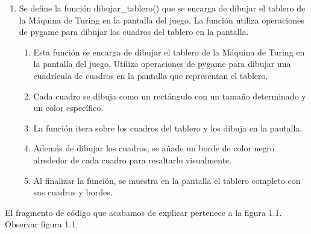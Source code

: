 \begin{enumerate}
    \item Se define la función dibujar\_tablero() que se encarga de dibujar el tablero de la Máquina de Turing en la pantalla del juego. La función utiliza operaciones de pygame para dibujar los cuadros del tablero en la pantalla.\newline
    \begin{enumerate}
        \item Esta función se encarga de dibujar el tablero de la Máquina de Turing en la pantalla del juego. Utiliza operaciones de pygame para dibujar una cuadrícula de cuadros en la pantalla que representan el tablero.\newline
        \item Cada cuadro se dibuja como un rectángulo con un tamaño determinado y un color específico.\newline
        \item La función itera sobre los cuadros del tablero y los dibuja en la pantalla.\newline
        \item Además de dibujar los cuadros, se añade un borde de color negro alrededor de cada cuadro para resaltarlo visualmente.\newline
        \item Al finalizar la función, se muestra en la pantalla el tablero completo con sus cuadros y bordes.\newline
    \end{enumerate}
\end{enumerate}

El fragmento de código que acabamos de explicar pertenece a la figura 1.1.  Observar figura 1.1.\newline

